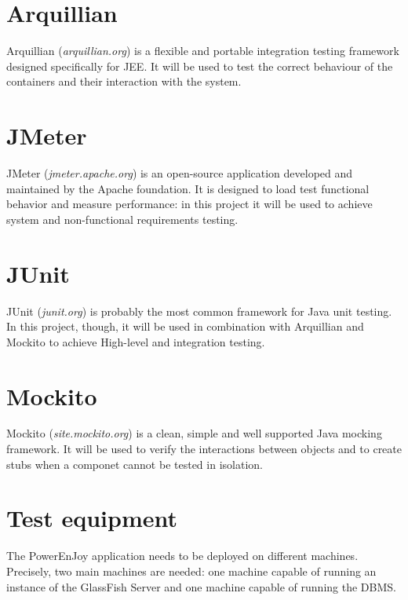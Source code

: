 \section{Arquillian}
Arquillian (\textit{arquillian.org}) is a flexible and portable integration testing framework designed specifically for JEE. It will be used to test the correct behaviour of the containers and their interaction with the system.

\section{JMeter}
JMeter (\textit{jmeter.apache.org}) is an open-source application developed and maintained by the Apache foundation. It is designed to load test functional behavior and measure performance: in this project it will be used to achieve system and non-functional requirements testing.


\section{JUnit}
JUnit (\textit{junit.org}) is probably the most common framework for Java unit testing. In this project, though, it will be used in combination with Arquillian and Mockito to achieve High-level and integration testing.

\section{Mockito}
Mockito (\textit{site.mockito.org}) is a clean, simple and well supported Java mocking framework. It will be used to verify the interactions between objects and to create stubs when a componet cannot be tested in isolation.

\newpage
\section{Test equipment}
The PowerEnJoy application needs to be deployed on different machines. Precisely, two main machines are needed: one machine capable of running an instance of the GlassFish Server and one machine capable of running the DBMS.
